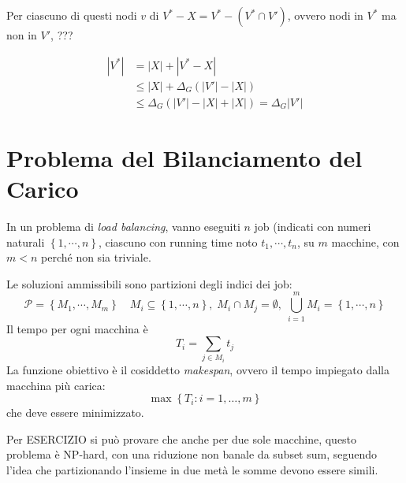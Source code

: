 Per ciascuno di questi nodi $v$ di $
V^* - X
=
V^* -
\left( 
    V^* \cap V'
\right)
$, ovvero nodi in $V^*$ ma non in $V'$,
???

\begin{align*}
    |V^*|
    &= 
    |X|
    +
    |V^* - X|
    \\
    &
    \leq
    |X| + 
    \Delta_G \left( 
        |V'| - |X|
    \right)
    \\
    &
    \leq
    \Delta_G \left( 
        |V'| -
        |X| + 
        |X|
    \right)
    =
    \Delta_G |V'|
\end{align*}


\section{Problema del Bilanciamento del Carico}

In un problema di \emph{load balancing}, vanno eseguiti $n$ job (indicati con numeri naturali $\left\{ 1, \cdots, n \right\}$,
ciascuno con running time noto $t_1, \cdots, t_n$, su $m$ macchine, con $m < n$ perché non sia triviale.

Le soluzioni ammissibili sono partizioni degli indici dei job: 
\begin{equation*}
    \mathcal{P} = 
    \left\{ 
        M_1, \cdots, M_m
    \right\}
    \quad
    M_i \subseteq \left\{ 1, \cdots, n \right\}
    , \;
    M_i \cap M_j = \emptyset
    , \;
    \bigcup_{i = 1}^{m} M_i
    = \left\{ 1, \cdots, n \right\}
\end{equation*}
Il tempo per ogni macchina è
\begin{equation*}
    T_i = 
    \sum_{j \in M_i} t_j
\end{equation*}
La funzione obiettivo è il cosiddetto \emph{makespan}, ovvero il tempo impiegato dalla macchina più carica:
\begin{equation*}
    \max
    \left\{ 
        T_i : i=1, \ldots, m
    \right\}
\end{equation*}
che deve essere minimizzato.

Per ESERCIZIO si può provare che anche per due sole macchine, questo problema è NP-hard, con una riduzione non banale da subset sum, seguendo l'idea che partizionando l'insieme in due metà le somme devono essere simili.

